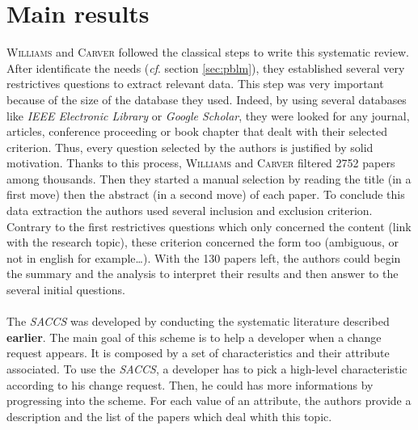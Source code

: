 \documentclass[12pt]{article}
\newcommand{\cf}{\emph{cf}.}
\begin{document}


\section{Main results}\label{sec:res}
\textsc{Williams} and \textsc{Carver} followed the classical steps to write this systematic review. After identificate the needs (\cf{} section \ref{sec:pblm}), they established several very restrictives questions to extract relevant data. This step was very important because of the size of the database they used. Indeed, by using several databases like \textit{IEEE Electronic Library} or \textit{Google Scholar}, they were looked for any journal, articles, conference proceeding or book chapter that dealt with their selected criterion. Thus, every question selected by the authors is justified by solid motivation. Thanks to this process, \textsc{Williams} and \textsc{Carver} filtered 2752 papers among thousands. Then they started a manual selection by reading the title (in a first move) then the abstract (in a second move) of each paper. To conclude this data extraction the authors used several inclusion and exclusion criterion. Contrary to the first restrictives questions which only concerned the content (link with the research topic), these criterion concerned the form too (ambiguous, or not in english for example\dots). With the 130 papers left, the authors could begin the summary and the analysis to interpret their results and then answer to the several initial questions.

\paragraph{}
The \textit{SACCS} was developed by conducting the systematic literature described \textbf{earlier}. The main goal of this scheme is to help a developer when a change request appears. It is composed by a set of characteristics and their attribute associated. To use the \textit{SACCS}, a developer has to pick a high-level characteristic according to his change request. Then, he could has more informations by progressing into the scheme. For each value of an attribute, the authors provide a description and the list of the papers which deal whith this topic.
\end{document}
